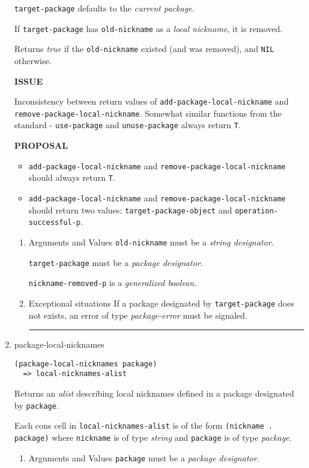 \documentclass[11pt]{article}
\begin{document}
\begin{enumerate}
\texttt{target-package} defaults to the \emph{current package}.

If \texttt{target-package} has \texttt{old-nickname} as a \emph{local nickname}, it is
removed.

Returns \emph{true} if the \texttt{old-nickname} existed (and was removed), and \texttt{NIL}
otherwise.

\textbf{ISSUE}

Inconsistency between return values of \texttt{add-package-local-nickname} and
\texttt{remove-package-local-nickname}. Somewhat similar functions from the
standard - \texttt{use-package} and \texttt{unuse-package} always return \texttt{T}.

\textbf{PROPOSAL}
\begin{itemize}
\item \texttt{add-package-local-nickname} and \texttt{remove-package-local-nickname} should
always return \texttt{T}.
\item \texttt{add-package-local-nickname} and \texttt{remove-package-local-nickname} should
return two values: \texttt{target-package-object} and \texttt{operation-successful-p}.
\end{itemize}
\begin{enumerate}
\item Arguments and Values
\label{sec:orgf33cfa9}
\texttt{old-nickname} must be a \emph{string designator}.

\texttt{target-package} must be a \emph{package designator}.

\texttt{nickname-removed-p} is a \emph{generalized boolean}.
\item Exceptional situations
\label{sec:orgc364130}
If a package designated by \texttt{target-package} does not exists, an error of
type \emph{package-error} must be signaled.

\noindent\rule{\textwidth}{0.5pt}
\end{enumerate}
\item package-local-nicknames
\label{sec:org76b6fe2}
\begin{verbatim}
(package-local-nicknames package)
  => local-nicknames-alist
\end{verbatim}

Returns an \emph{alist} describing local nicknames defined in a package
designated by \texttt{package}.

Each cons cell in \texttt{local-nicknames-alist} is of the form \texttt{(nickname . package)}
where \texttt{nickname} is of type \emph{string} and \texttt{package} is of type
\emph{package}.
\begin{enumerate}
\item Arguments and Values
\label{sec:org5272324}
\texttt{package} must be a \emph{package designator}.


\end{enumerate}
\end{enumerate}
\end{document}
